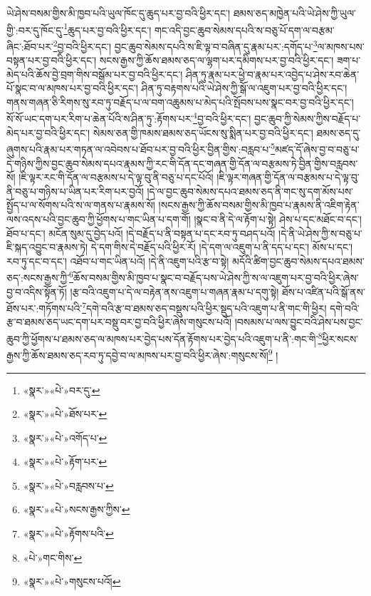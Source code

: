 ཡེ་ཤེས་བསམ་གྱིས་མི་ཁྱབ་པའི་ཡུལ་ཁོང་དུ་ཆུད་པར་བྱ་བའི་ཕྱིར་དང་། ཐམས་ཅད་མཁྱེན་པའི་ཡེ་ཤེས་ཀྱི་ཡུལ་གྱི་:བར་དུ་ཁོང་དུ་\footnote{«སྣར་»«པེ་»བར་དུ་}ཆུད་པར་བྱ་བའི་ཕྱིར་དང་། གང་འདི་བྱང་ཆུབ་སེམས་དཔའི་ས་བཅུ་པོ་དག་ལ་བརྩམ་ཞིང་:ཐོབ་པར་\footnote{«སྣར་»«པེ་»ཐོས་པར་}བྱ་བའི་ཕྱིར་དང་། བྱང་ཆུབ་སེམས་དཔའི་ས་ཇི་ལྟ་བ་བཞིན་དུ་རྣམ་པར་:དགོད་པ་\footnote{«སྣར་»«པེ་»འགོད་པ་}ལ་མཁས་པས་བསྟན་པར་བྱ་བའི་ཕྱིར་དང་། སངས་རྒྱས་ཀྱི་ཆོས་ཐམས་ཅད་ལ་ལྷག་པར་དམིགས་པར་བྱ་བའི་ཕྱིར་དང་། ཟག་པ་མེད་པའི་ཆོས་བྱེ་བྲག་གིས་བསྒོམ་པར་བྱ་བའི་ཕྱིར་དང་། ཤིན་ཏུ་རྣམ་པར་ཕྱེ་བ་རྣམ་པར་འབྱེད་པ་ཤེས་རབ་ཆེན་པོ་སྣང་བ་ལ་མཁས་པར་བྱ་བའི་ཕྱིར་དང་། ཤིན་ཏུ་བརྟགས་པའི་ཡེ་ཤེས་ཀྱི་སྒོ་ལ་འཇུག་པར་བྱ་བའི་ཕྱིར་དང་། གནས་གཞན་ཅི་རིགས་སུ་རབ་ཏུ་བརྗོད་པ་ལ་བག་འཆུམས་པ་མེད་པའི་སྤོབས་པས་སྣང་བར་བྱ་བའི་ཕྱིར་དང་། སོ་སོ་ཡང་དག་པར་རིག་པ་ཆེན་པོའི་ས་ཤིན་ཏུ་:རྟོགས་པར་\footnote{«སྣར་»«པེ་»རྟོག་པར་}བྱ་བའི་ཕྱིར་དང་། བྱང་ཆུབ་ཀྱི་སེམས་ཀྱིས་བརྗོད་པ་མེད་པར་བྱ་བའི་ཕྱིར་དང་། སེམས་ཅན་གྱི་ཁམས་ཐམས་ཅད་ཡོངས་སུ་སྨིན་པར་བྱ་བའི་ཕྱིར་དང་། ཐམས་ཅད་དུ་ཞུགས་པའི་རྣམ་པར་གཏན་ལ་འབེབས་པ་ཐོབ་པར་བྱ་བའི་ཕྱིར་བྱིན་གྱིས་:བརླབ་པ་\footnote{«སྣར་»«པེ་»བརླབས་པ་}མཛད་དོ་ཞེས་བྱ་བ་བཅུ་པ་དེ་གཉིས་ཀྱིས་བྱང་ཆུབ་སེམས་དཔའ་རྣམས་ཀྱི་རང་གི་དོན་དང་གཞན་གྱི་དོན་ལ་བརྩམས་ཏེ་བྱིན་གྱིས་བརླབས་སོ། །ཇི་ལྟར་རང་གི་དོན་ལ་བརྩམས་པ་དེ་ལྟ་བུ་ནི་བཅུ་པ་དང་པོའོ། །ཇི་ལྟར་གཞན་གྱི་དོན་ལ་བརྩམས་པ་དེ་ལྟ་བུ་ནི་བཅུ་པ་གཉིས་པ་ཡིན་པར་རིག་པར་བྱའོ། །དེ་ལ་བྱང་ཆུབ་སེམས་དཔའ་ཐམས་ཅད་ནི་གང་སུ་དག་མོས་པས་སྤྱོད་པ་ལ་སོགས་པའི་ས་ལ་གནས་པ་རྣམས་སོ། །སངས་རྒྱས་ཀྱི་ཆོས་བསམ་གྱིས་མི་ཁྱབ་པ་རྣམས་ནི་འཇིག་རྟེན་ལས་འདས་པའི་བྱང་ཆུབ་ཀྱི་ཕྱོགས་པ་གང་ཡིན་པ་དག་གོ། །སྣང་བ་ནི་དེ་ལ་རྟོག་པ་སྟེ། ཤེས་པ་དང་མཐོང་བ་དང་། ཐོབ་པ་དང་། མངོན་སུམ་དུ་བྱེད་པའོ། །དེ་བརྗོད་པ་ནི་བསྟན་པ་དང་རབ་ཏུ་བཤད་པའོ། །དེ་ནི་ཡེ་ཤེས་ཀྱི་ས་བཅུ་པ་ཇི་སྐད་འབྱུང་བ་རྣམས་ཏེ། དེ་དག་གིས་དེ་བརྗོད་པའི་ཕྱིར་རོ། །དེ་དག་ལ་འཇུག་པ་ནི་དད་པ་དང་། མོས་པ་དང་། རབ་ཏུ་དང་བ་དང་། འཐོབ་པ་གང་ཡིན་པའོ། །དེ་ནི་འཇུག་པའི་རྩ་བ་སྟེ། མདོའི་ཚིག་བྱང་ཆུབ་སེམས་དཔའ་ཐམས་ཅད་:སངས་རྒྱས་ཀྱི་\footnote{«སྣར་»«པེ་»སངས་རྒྱས་ཀྱིས་}ཆོས་བསམ་གྱིས་མི་ཁྱབ་པ་སྣང་བ་བརྗོད་པས་ཡེ་ཤེས་ཀྱི་ས་ལ་འཇུག་པར་བྱ་བའི་ཕྱིར་ཞེས་བྱ་བ་འདིས་སྟོན་ཏོ། །རྩ་བའི་འཇུག་པ་དེ་ལ་བརྟེན་ནས་འཇུག་པ་གཞན་རྣམ་པ་དགུ་སྟེ། ཐོས་པ་འཛིན་པའི་སྒོ་ནས་ཐོས་པར་:གཏོགས་པའི་\footnote{«སྣར་»«པེ་»རྟོགས་པའི་}དགེ་བའི་རྩ་བ་ཐམས་ཅད་བསྡུས་པའི་ཕྱིར་སྡུད་པའི་འཇུག་པ་ནི་གང་གི་ཕྱིར། དགེ་བའི་རྩ་བ་ཐམས་ཅད་ཡང་དག་པར་བསྡུ་བར་བྱ་བའི་ཕྱིར་ཞེས་གསུངས་པའོ། །བསམས་པ་ལས་བྱུང་བའི་ཤེས་པས་བྱང་ཆུབ་ཀྱི་ཕྱོགས་པ་ཐམས་ཅད་ལ་མཁས་པར་བྱེད་པས་དོན་རྟོགས་པར་བྱེད་པའི་འཇུག་པ་ནི་:གང་གི་\footnote{«པེ་»གང་གིས་}ཕྱིར་སངས་རྒྱས་ཀྱི་ཆོས་ཐམས་ཅད་རབ་ཏུ་དབྱེ་བ་ལ་མཁས་པར་བྱ་བའི་ཕྱིར་ཞེས་:གསུངས་སོ།\footnote{«སྣར་»«པེ་»གསུངས་པའོ།} །
